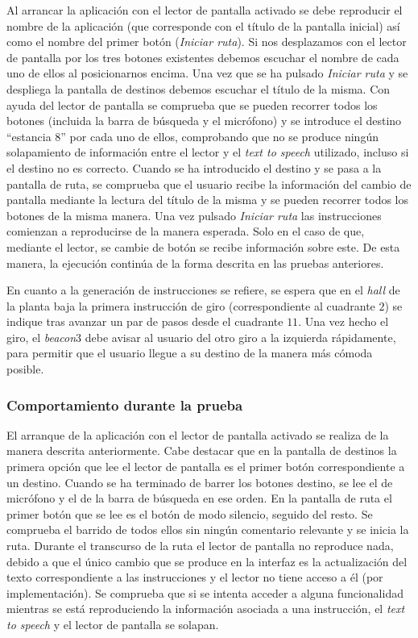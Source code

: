 Al arrancar la aplicación con el lector de pantalla activado se debe reproducir el nombre de la aplicación (que corresponde con el título de la pantalla inicial) así como el nombre del primer botón (\textit{Iniciar ruta}). Si nos desplazamos con el lector de pantalla por los tres botones existentes debemos escuchar el nombre de cada uno de ellos al posicionarnos encima. Una vez que se ha pulsado \textit{Iniciar ruta} y se despliega la pantalla de destinos debemos escuchar el título de la misma. Con ayuda del lector de pantalla se comprueba que se pueden recorrer todos los botones (incluida la barra de búsqueda y el micrófono) y se introduce el destino ``estancia 8'' por cada uno de ellos, comprobando que no se produce ningún solapamiento de información entre el lector y el \textit{text to speech} utilizado, incluso si el destino no es correcto. Cuando se ha introducido el destino y se pasa a la pantalla de ruta, se comprueba que el usuario recibe la información del cambio de pantalla mediante la lectura del título de la misma y se pueden recorrer todos los botones de la misma manera. Una vez pulsado \textit{Iniciar ruta} las instrucciones comienzan a reproducirse de la manera esperada. Solo en el caso de que, mediante el lector, se cambie de botón se recibe información sobre este. De esta manera, la ejecución continúa de la forma descrita en las pruebas anteriores.  

En cuanto a la generación de instrucciones se refiere, se espera que en el \textit{hall} de la planta baja la primera instrucción de giro (correspondiente al cuadrante $2$) se indique tras avanzar un par de pasos desde el cuadrante $11$. Una vez hecho el giro, el \textit{beacon$3$} debe avisar al usuario del otro giro a la izquierda rápidamente, para permitir que el usuario llegue a su destino de la manera más cómoda posible.

\subsubsection*{Comportamiento durante la prueba}

El arranque de la aplicación con el lector de pantalla activado se realiza de la manera descrita anteriormente. Cabe destacar que en la pantalla de destinos la primera opción que lee el lector de pantalla es el primer botón correspondiente a un destino. Cuando se ha terminado de barrer los botones destino, se lee el de micrófono y el de la barra de búsqueda en ese orden. En la pantalla de ruta el primer botón que se lee es el botón de modo silencio, seguido del resto. Se comprueba el barrido de todos ellos sin ningún comentario relevante y se inicia la ruta. Durante el transcurso de la ruta el lector de pantalla no reproduce nada, debido a que el único cambio que se produce en la interfaz es la actualización del texto correspondiente a las instrucciones y el lector no tiene acceso a él (por implementación). Se comprueba que si se intenta acceder a alguna funcionalidad mientras se está reproduciendo la información asociada a una instrucción, el \textit{text to speech} y el lector de pantalla se solapan. 

